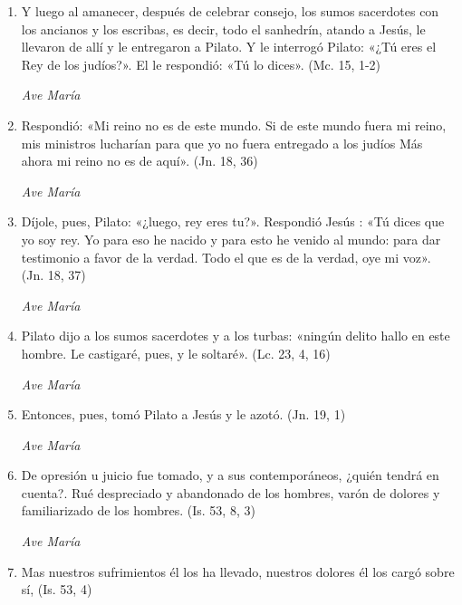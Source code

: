 \documentclass[a4paper,11pt, oneside]{report}
\begin{document}
        \begin{enumerate}
          
          \item Y luego al amanecer, después de celebrar consejo, los sumos sacerdotes con los ancianos y los escribas, es decir, todo el sanhedrín, atando a Jesús,
          le llevaron de allí y le entregaron a Pilato. Y le interrogó Pilato: «¿Tú eres el Rey de los judíos?». El le respondió: «Tú lo dices». (Mc. 15, 1-2)

          \textit{Ave María}

          \item Respondió: «Mi reino no es de este mundo. Si de este mundo fuera mi reino, mis ministros lucharían para que yo no fuera entregado a los judíos
          Más ahora mi reino no es de aquí». (Jn. 18, 36)

          \textit{Ave María}

          \item Díjole, pues, Pilato: «¿luego, rey eres tu?». Respondió Jesús : «Tú dices que yo soy rey. Yo para eso he nacido y para esto he venido
          al mundo: para dar testimonio a favor de la verdad. Todo el que es de la verdad, oye mi voz». (Jn. 18, 37)

          \textit{Ave María}

          \item Pilato dijo a los sumos sacerdotes y a los turbas: «ningún delito hallo en este hombre. 
          Le castigaré, pues, y le soltaré». (Lc. 23, 4, 16)

          \textit{Ave María}

          \item Entonces, pues, tomó Pilato a Jesús y le azotó. (Jn. 19, 1)

          \textit{Ave María}

          \item De opresión u juicio fue tomado, y a sus contemporáneos, ¿quién tendrá en cuenta?. Rué despreciado y abandonado de los hombres,
          varón de dolores y familiarizado de los hombres. (Is. 53, 8, 3)

          \textit{Ave María}

          \item Mas nuestros sufrimientos él los ha llevado, nuestros dolores él los cargó sobre sí, (Is. 53, 4)


\end{enumerate}
\end{document}
